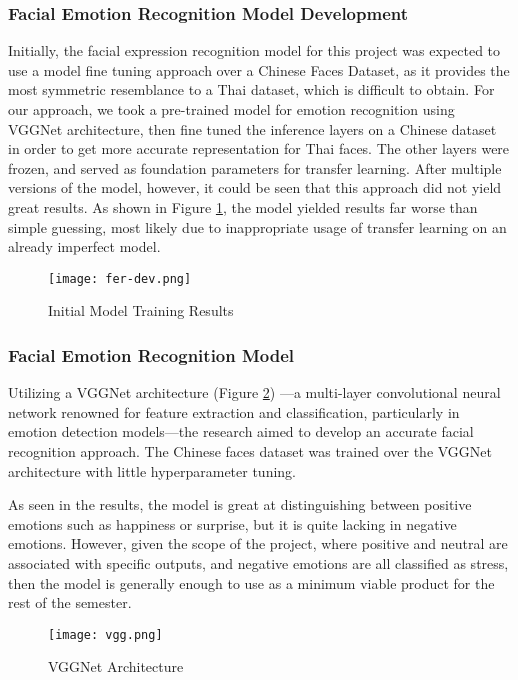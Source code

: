\newpage
\subsubsection{Facial Emotion Recognition Model Development}
Initially, the facial expression recognition model for this project was expected to use a model fine tuning approach over a Chinese Faces Dataset, as it provides the most symmetric resemblance to a Thai dataset, which is difficult to obtain. For our approach, we took a pre-trained model for emotion recognition using VGGNet architecture, then fine tuned the inference layers on a Chinese dataset in order to get more accurate representation for Thai faces. The other layers were frozen, and served as foundation parameters for transfer learning. After multiple versions of the model, however, it could be seen that this approach did not yield great results. As shown in Figure \ref{fig:fer-dev}, the model yielded results far worse than simple guessing, most likely due to inappropriate usage of transfer learning on an already imperfect model.

\begin{figure} [!htb]
    \centering
    \captionsetup{justification=centering}
    \texttt{[image: fer-dev.png]}
    \caption{Initial Model Training Results}
    \label{fig:fer-dev}
\end{figure}

\subsubsection{Facial Emotion Recognition Model}
Utilizing a VGGNet \cite{simonyan2015deepconvolutionalnetworkslargescale} architecture (Figure \ref{fig:vgg}) —a multi-layer convolutional neural network renowned for feature extraction and classification, particularly in emotion detection models—the research aimed to develop an accurate facial recognition approach. The Chinese faces dataset was trained over the VGGNet architecture with little hyperparameter tuning.

As seen in the results, the model is great at distinguishing between positive emotions such as happiness or surprise, but it is quite lacking in negative emotions. However, given the scope of the project, where positive and neutral are associated with specific outputs, and negative emotions are all classified as stress, then the model is generally enough to use as a minimum viable product for the rest of the semester.

\begin{figure}
    \centering
    \captionsetup{justification=centering}
    \texttt{[image: vgg.png]}
    \caption{VGGNet Architecture}
    \label{fig:vgg}
\end{figure}


